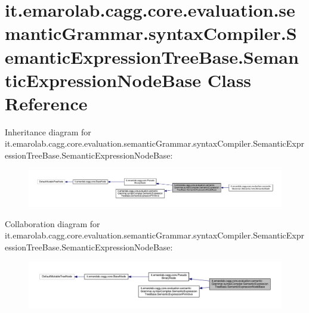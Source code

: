 \hypertarget{classit_1_1emarolab_1_1cagg_1_1core_1_1evaluation_1_1semanticGrammar_1_1syntaxCompiler_1_1Semantec1f2fc886c35d505e2bc10592e2dff6}{\section{it.\-emarolab.\-cagg.\-core.\-evaluation.\-semantic\-Grammar.\-syntax\-Compiler.\-Semantic\-Expression\-Tree\-Base.\-Semantic\-Expression\-Node\-Base Class Reference}
\label{classit_1_1emarolab_1_1cagg_1_1core_1_1evaluation_1_1semanticGrammar_1_1syntaxCompiler_1_1Semantec1f2fc886c35d505e2bc10592e2dff6}
}


Inheritance diagram for it.\-emarolab.\-cagg.\-core.\-evaluation.\-semantic\-Grammar.\-syntax\-Compiler.\-Semantic\-Expression\-Tree\-Base.\-Semantic\-Expression\-Node\-Base\-:\nopagebreak
\begin{figure}[H]
\begin{center}
\leavevmode
\includegraphics[width=350pt]{classit_1_1emarolab_1_1cagg_1_1core_1_1evaluation_1_1semanticGrammar_1_1syntaxCompiler_1_1Semantda892844d38973f1df543432a799d551}
\end{center}
\end{figure}


Collaboration diagram for it.\-emarolab.\-cagg.\-core.\-evaluation.\-semantic\-Grammar.\-syntax\-Compiler.\-Semantic\-Expression\-Tree\-Base.\-Semantic\-Expression\-Node\-Base\-:\nopagebreak
\begin{figure}[H]
\begin{center}
\leavevmode
\includegraphics[width=350pt]{classit_1_1emarolab_1_1cagg_1_1core_1_1evaluation_1_1semanticGrammar_1_1syntaxCompiler_1_1Semante20b47ff14ad7fa6bd12fca40aae0a44}
\end{center}
\end{figure}
